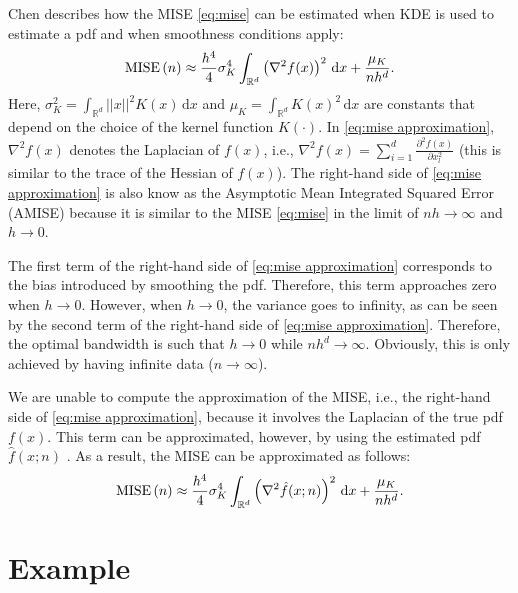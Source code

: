 \documentclass[10pt,final,a4paper,oneside,onecolumn]{article}
\newcommand*{\ud}{\mathrm{\,d}}                                 %
\newcommand{\mise}[1]{\textup{MISE} \left( #1 \right)}
\theoremstyle{plain}\newtheorem{definition}{Definition}[section]    %
\theoremstyle{definition}\newtheorem{example}{Example}[section]     %
\theoremstyle{remark}\newtheorem{remarkenv}{Remark}[section]        %
\begin{document}
Chen \cite{chen2017tutorial} describes how the MISE \cref{eq:mise} can be estimated when KDE is used to estimate a pdf and when smoothness conditions apply:
\begin{equation} \label{eq:mise approximation}
	\mise{n} \approx \frac{h^4}{4} \sigma_K^4 \int_{\mathbb{R}^d} \left(\nabla^2 f(x)\right)^2 \, \textup{d}x + \frac{\mu_K}{nh^d}.
\end{equation}
Here, $\sigma_K^2 = \int_{\mathbb{R}^d} ||x||^2 K(x) \ud x$ and $\mu_K = \int_{\mathbb{R}^d} K(x)^2 \ud x$ are constants that depend on the choice of the kernel function $K(\cdot)$. In \cref{eq:mise approximation}, $\nabla^2 f(x)$ denotes the Laplacian of $f(x)$, i.e., $\nabla^2 f(x) = \sum_{i=1}^d \frac{\partial^2 f(x)}{\partial x_l^2}$ (this is similar to the trace of the Hessian of $f(x)$). The right-hand side of \cref{eq:mise approximation} is also know as the Asymptotic Mean Integrated Squared Error (AMISE) because it is similar to the MISE \cref{eq:mise} in the limit of $nh \rightarrow \infty$ and $h \rightarrow 0$.

The first term of the right-hand side of \cref{eq:mise approximation} corresponds to the bias introduced by smoothing the pdf. Therefore, this term approaches zero when $h \rightarrow 0$. However, when $h \rightarrow 0$, the variance goes to infinity, as can be seen by the second term of the right-hand side of \cref{eq:mise approximation}. Therefore, the optimal bandwidth is such that $h \rightarrow 0$ while $nh^d \rightarrow \infty$. Obviously, this is only achieved by having infinite data ($n \rightarrow \infty$).

We are unable to compute the approximation of the MISE, i.e., the right-hand side of \cref{eq:mise approximation}, because it involves the Laplacian of the true pdf $f(x)$. This term can be approximated, however, by using the estimated pdf $\hat{f}(x;n)$ \cite{calonico2018effect}. As a result, the MISE can be approximated as follows:
\begin{equation} \label{eq:mise final approximation}
	\mise{n} \approx \frac{h^4}{4} \sigma_K^4 \int_{\mathbb{R}^d} \left(\nabla^2 \hat{f}(x;n)\right)^2 \, \textup{d}x + \frac{\mu_K}{nh^d}.
\end{equation}



\section{Example}
\label{sec:example}
\end{document}
